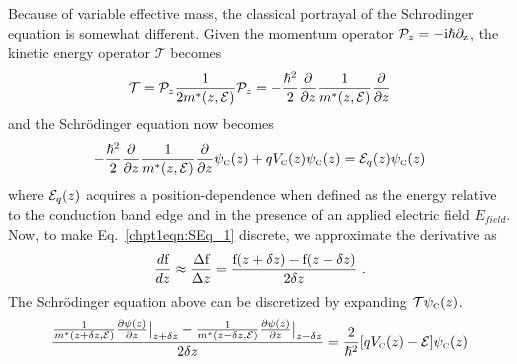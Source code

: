 Because of variable effective mass, the classical portrayal of the Schrodinger equation is somewhat different.  Given the momentum operator $\mathcal{P}_z = -\rm{i} \hslash \partial_z$, the kinetic energy operator $\mathcal{T}$ becomes \cite{Sirtori:PRB:1994}
\begin{equation}
\mathcal{T} = \mathcal{P}_z \frac{1}{2 m^*(z,\EE)} \mathcal{P}_z =
-\frac{\hslash^2}{2} \frac{\partial}{\partial z} \frac{1}{m^*(z,\EE)} \frac{\partial}{\partial z}
\end{equation}
and the Schr\"{o}dinger equation now becomes
\begin{equation}
\label{chpt1eqn:SEq_1}
-\frac{\hslash^2}{2} \frac{\partial}{\partial z} \frac{1}{m^*(z,\EE)} \frac{\partial}{\partial z} \psi_\tn{\tiny{C}}(z) + q V_\tn{\tiny{C}}(z) \psi_\tn{\tiny{C}}(z) = \EE_q(z) \psi_\tn{\tiny{C}}(z)
\end{equation}
where $\EE_q(z)$ acquires a position-dependence when defined as the energy relative to the conduction band edge and in the presence of an applied electric field $E_\textit{field}$.  Now, to make Eq.~\eqref{chpt1eqn:SEq_1} discrete, we approximate the derivative as
\begin{equation}
\label{chpt1eqn:discrete_derivative}
\frac{d \textnormal{f}}{dz} \approx \frac{\Delta \textnormal{f}}{\Delta z} = \frac{\textnormal{f}(z+\delta z) -\textnormal{f}(z-\delta z)}{2 \delta z} \text{~.}
\end{equation}
The Schr\"{o}dinger equation above can be discretized by expanding $\mathcal{T} \psi_{\textnormal{\tiny{C}}}(z)$.
\begin{equation}
\frac{\frac{1}{m^{*}(z+\delta z,\EE)} \frac{\partial \psi(z)}{\partial z} \big |_{z+\delta z} - \frac{1}{m^{*}(z-\delta z,\EE)} \frac{\partial \psi(z)}{\partial z} \big |_{z-\delta z}}{2 \delta z} = \frac{2}{\hslash^2}[q V_\tn{\tiny{C}}(z)-\EE]\psi_\tn{\tiny{C}}(z)
\end{equation}
